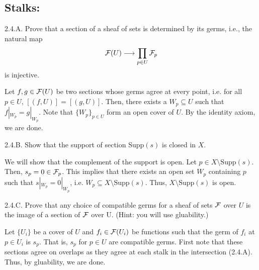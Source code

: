 \subsection{Stalks:}

\begin{exercise}{2.4.A.} 
Prove that a section of a sheaf of sets is determined by its germs, i.e., the natural map
\[\mathcal{F}(U) \longrightarrow \prod_{p \in U} \mathcal{F}_p \]
is injective.
\end{exercise}
\begin{solution}
    Let $f, g \in \mathcal{F}(U)$ be two sections whose germs agree at every point, i.e. for all $p \in U$, $[(f, U)] = [(g, U)]$. Then, there exists a $W_p \subseteq U$ such that $f|_{W_p} = g|_{W_p}$. Note that $\{W_p\}_{p \in U}$ form an open cover of $U$. By the identity axiom, we are done.
\end{solution}

\begin{exercise}{2.4.B.} 
    Show that the support of section $\mathrm{Supp}(s)$ is closed in $X$. 
\end{exercise}
\begin{solution}
    We will show that the complement of the support is open. Let $p \in X \setminus \mathrm{Supp}(s)$. Then, $s_p = 0 \in \mathcal{F}_p$. This implies that there exists an open set $W_p$ containing $p$ such that $s|_{W_p} = 0|_{W_p}$, i.e. $W_p \subseteq X \setminus \mathrm{Supp}(s)$. Thus, $X \setminus \mathrm{Supp}(s)$ is open. 
\end{solution}

\begin{exercise}{2.4.C.} 
    Prove that any choice of compatible germs for a sheaf of sets $\mathcal{F}$ over $U$ is the image of a section of $\mathcal{F}$ over U. (Hint: you will use gluability.)
\end{exercise}
\begin{solution}
    Let $\{U_i\}$ be a cover of $U$ and $f_i \in \mathcal{F}(U_i)$ be functions such that the germ of $f_i$ at $p \in U_i$ is $s_p$. That is, $s_p$ for $p \in U$ are compatible germs. First note that these sections agree on overlaps as they agree at each stalk in the intersection (2.4.A). Thus, by gluability, we are done. 
    
\end{solution}

